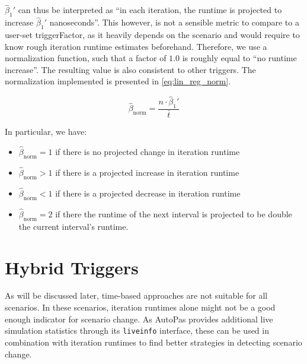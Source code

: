 $\hat\beta_1'$ can thus be interpreted as \enquote{in each iteration, the runtime is projected to increase $\hat\beta_1'$ nanoseconds}. This however, is not a sensible metric to compare to a user-set triggerFactor, as it heavily depends on the scenario and would require to know rough iteration runtime estimates beforehand. Therefore, we use a normalization function, such that a factor of $1.0$ is roughly equal to \enquote{no runtime increase}. The resulting value is also consistent to other triggers. The normalization implemented is presented in \eqref{eq:lin_reg_norm}.


\begin{equation}
	\hat\beta_{\text{norm}} = \frac{n\cdot\hat\beta_1'}{\bar t}\label{eq:lin_reg_norm}
\end{equation}

In particular, we have:
\vspace{-\topsep}
\begin{itemize}
	\item $\hat\beta_{\text{norm}} = 1$ if there is no projected change in iteration runtime
	\item $\hat\beta_{\text{norm}} > 1$ if there is a projected increase in iteration runtime
	\item $\hat\beta_{\text{norm}} < 1$ if there is a projected decrease in iteration runtime
	\item $\hat\beta_{\text{norm}} = 2$ if there the runtime of the next interval is projected to be double the current interval's runtime.
\end{itemize}

\section{Hybrid Triggers}
As will be discussed later, time-based approaches are not suitable for all scenarios. In these scenarios, iteration runtimes alone might not be a good enough indicator for scenario change. As AutoPas provides additional live simulation statistics through its \texttt{liveinfo} interface, these can be used in combination with iteration runtimes to find better strategies in detecting scenario change.


